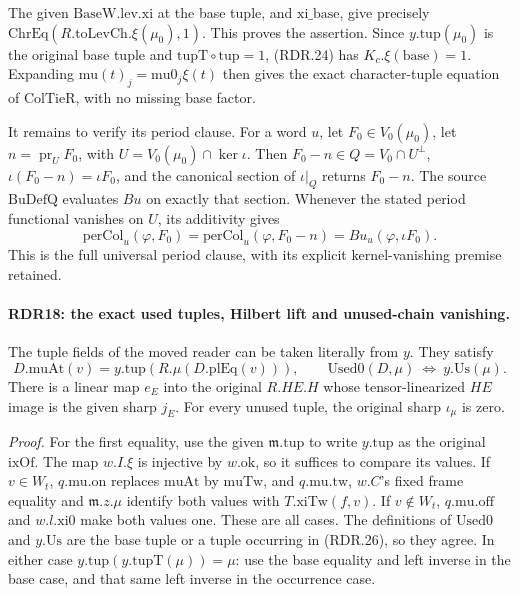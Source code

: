The given \(\mathrm{BaseW.lev.xi}\) at the base tuple,
and \(\mathrm{xi\_base}\), give precisely
\(\mathrm{ChrEq}(R.\mathrm{toLevCh}.\xi(\mu_0),1)\).
This proves the assertion.  Since \(y.\mathrm{tup}(\mu_0)\)
is the original base tuple and \(\mathrm{tupT}\circ\mathrm{tup}=1\),
(RDR.24) has \(K_c.\xi(\mathrm{base})=1\).
Expanding \(\mathrm{mu}(t)_j=\mathrm{mu0}_j\xi(t)\)
then gives the exact character-tuple equation of
\(\mathrm{ColTieR}\), with no missing base factor.

It remains to verify its period clause.  For a word \(u\),
let \(F_0\in V_0(\mu_0)\), let
\(n=\operatorname{pr}_{U}F_0\), with
\(U=V_0(\mu_0)\cap\ker\iota\).  Then
\(F_0-n\in Q=V_0\cap U^\perp\),
\(\iota(F_0-n)=\iota F_0\), and the canonical section of
\(\iota|_Q\) returns \(F_0-n\).  The source
\(\mathrm{BuDefQ}\) evaluates \(Bu\) on exactly that
section.  Whenever the stated period functional vanishes
on \(U\), its additivity gives
\[
 \mathrm{perCol}_u(\varphi,F_0)
    =\mathrm{perCol}_u(\varphi,F_0-n)
    =Bu_u(\varphi,\iota F_0).                              \tag{RDR.25}
\]
This is the full universal period clause, with its explicit
kernel-vanishing premise retained.

\paragraph{RDR18: the exact used tuples, Hilbert lift and unused-chain vanishing.}
\label{claim:RDR18}
The tuple fields of the moved reader can be taken literally
from \(y\).  They satisfy
\[
 D.\mathrm{muAt}(v)
      =y.\mathrm{tup}(R.\mu(D.\mathrm{plEq}(v))),\qquad
 \mathrm{Used0}(D,\mu)\ \Longleftrightarrow\ y.\mathrm{Us}(\mu).
                                                               \tag{RDR.26}
\]
There is a linear map \(e_E\) into the original \(R.HE.H\)
whose tensor-linearized \(HE\) image is the given sharp
\(j_E\).  For every unused tuple, the original sharp
\(\iota_\mu\) is zero.

\emph{Proof.}
For the first equality, use the given \(\mathfrak m.\mathrm{tup}\)
to write \(y.\mathrm{tup}\) as the original \(\mathrm{ixOf}\).
The map \(w.I.\xi\) is injective by \(w.\mathrm{ok}\),
so it suffices to compare its values.  If \(v\in W_t\),
\(q.\mathrm{mu.on}\) replaces \(\mathrm{muAt}\) by
\(\mathrm{muTw}\), and \(q.\mathrm{mu.tw}\), \(w.C\)'s
fixed frame equality and \(\mathfrak m.z.\mu\) identify both
values with \(T.\mathrm{xiTw}(f,v)\).  If \(v\notin W_t\),
\(q.\mathrm{mu.off}\) and \(w.l.\mathrm{xi0}\) make
both values one.  These are all cases.  The definitions of
\(\mathrm{Used0}\) and \(y.\mathrm{Us}\) are the base tuple
or a tuple occurring in (RDR.26), so they agree.  In either
case \(y.\mathrm{tup}(y.\mathrm{tupT}(\mu))=\mu\):
use the base equality and left inverse in the base case,
and that same left inverse in the occurrence case.


